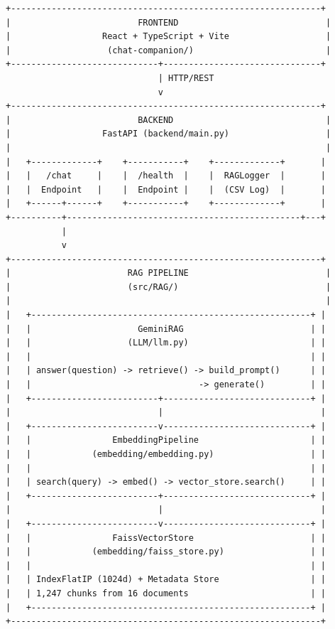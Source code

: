 \documentclass[../DoAn.tex]{subfiles}
\begin{document}
\begin{verbatim}
+-------------------------------------------------------------+
|                         FRONTEND                             |
|                  React + TypeScript + Vite                   |
|                   (chat-companion/)                          |
+-----------------------------+-------------------------------+
                              | HTTP/REST
                              v
+-------------------------------------------------------------+
|                         BACKEND                              |
|                  FastAPI (backend/main.py)                   |
|                                                              |
|   +-------------+    +-----------+    +-------------+       |
|   |   /chat     |    |  /health  |    |  RAGLogger  |       |
|   |  Endpoint   |    |  Endpoint |    |  (CSV Log)  |       |
|   +------+------+    +-----------+    +-------------+       |
+----------+----------------------------------------------+---+
           |
           v
+-------------------------------------------------------------+
|                       RAG PIPELINE                           |
|                       (src/RAG/)                             |
|                                                              |
|   +-------------------------------------------------------+ |
|   |                     GeminiRAG                         | |
|   |                   (LLM/llm.py)                        | |
|   |                                                       | |
|   | answer(question) -> retrieve() -> build_prompt()      | |
|   |                                 -> generate()         | |
|   +-------------------------+-----------------------------+ |
|                             |                               |
|   +-------------------------v-----------------------------+ |
|   |                EmbeddingPipeline                      | |
|   |            (embedding/embedding.py)                   | |
|   |                                                       | |
|   | search(query) -> embed() -> vector_store.search()     | |
|   +-------------------------+-----------------------------+ |
|                             |                               |
|   +-------------------------v-----------------------------+ |
|   |                FaissVectorStore                       | |
|   |            (embedding/faiss_store.py)                 | |
|   |                                                       | |
|   | IndexFlatIP (1024d) + Metadata Store                  | |
|   | 1,247 chunks from 16 documents                        | |
|   +-------------------------------------------------------+ |
+-------------------------------------------------------------+
\end{verbatim}
\end{document}
